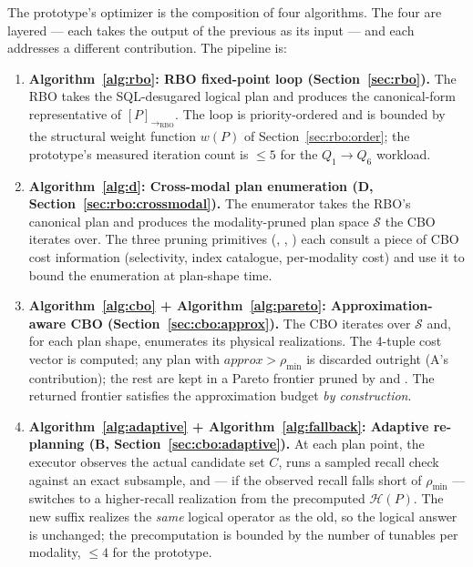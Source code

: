 \documentclass[sigconf,nonacm,review]{acmart}
\theoremstyle{plain}
\theoremstyle{definition}
\theoremstyle{remark}
\begin{document}
The prototype's optimizer is the composition of four
algorithms. The four are layered --- each takes the output of
the previous as its input --- and each addresses a different
contribution. The pipeline is:

\begin{enumerate}[leftmargin=*, itemsep=0pt]
  \item \textbf{Algorithm~\ref{alg:rbo}: RBO fixed-point
  loop (Section~\ref{sec:rbo}).} The RBO takes the
  SQL-desugared logical plan and produces the
  canonical-form representative of
  $[P]_{\to_{\mathrm{RBO}}}$. The loop is
  priority-ordered and is bounded by the structural weight
  function $w(P)$ of Section~\ref{sec:rbo:order}; the
  prototype's measured iteration count is $\le 5$ for the
  $Q_1 \to Q_6$ workload.
  \item \textbf{Algorithm~\ref{alg:d}: Cross-modal plan
  enumeration (D, Section~\ref{sec:rbo:crossmodal}).} The
  enumerator takes the RBO's canonical plan and produces the
  modality-pruned plan space $\mathcal{S}$ the CBO iterates
  over. The three pruning primitives
  (, ,
  ) each consult a piece of
  CBO cost information (selectivity, index catalogue,
  per-modality cost) and use it to bound the enumeration at
  plan-shape time.
  \item \textbf{Algorithm~\ref{alg:cbo} +
  Algorithm~\ref{alg:pareto}: Approximation-aware CBO
  (Section~\ref{sec:cbo:approx}).} The CBO iterates over
  $\mathcal{S}$ and, for each plan shape, enumerates its
  physical realizations. The 4-tuple cost vector is
  computed; any plan with $\mathit{approx} > \rho_{\min}$
  is discarded outright (A's contribution); the rest are
  kept in a Pareto frontier pruned by 
  and . The returned frontier
  satisfies the approximation budget \emph{by construction}.
  \item \textbf{Algorithm~\ref{alg:adaptive} +
  Algorithm~\ref{alg:fallback}: Adaptive re-planning (B,
  Section~\ref{sec:cbo:adaptive}).} At each plan point, the
  executor observes the actual candidate set $C$, runs a
  sampled recall check against an exact subsample, and ---
  if the observed recall falls short of $\rho_{\min}$ ---
  switches to a higher-recall realization from the
  precomputed $\mathcal{H}(P)$. The new suffix realizes
  the \emph{same} logical operator as the old, so the
  logical answer is unchanged; the precomputation is
  bounded by the number of tunables per modality, $\le 4$
  for the prototype.
\end{enumerate}
\end{document}
